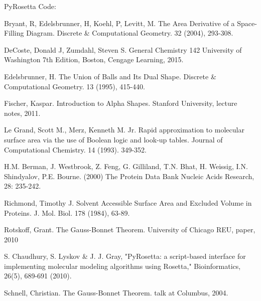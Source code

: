 \documentclass{article}
\begin{document}
PyRosetta Code:


\begin{thebibliography}{10}

Bryant, R, Edelsbrunner, H, Koehl, P, Levitt, M. The Area Derivative of a Space-Filling Diagram. Discrete \& Computational Geometry. 32 (2004), 293-308.

DeCoste, Donald J, Zumdahl, Steven S. General Chemistry 142 University of Washington 7th Edition, Boston, Cengage Learning, 2015.

Edelsbrunner, H. The Union of Balls and Its Dual Shape. Discrete \& Computational Geometry. 13 (1995), 415-440.

Fischer, Kaspar. Introduction to Alpha Shapes. Stanford University, lecture notes, 2011.

Le Grand, Scott M., Merz, Kenneth M. Jr. Rapid approximation to molecular surface area via the use of Boolean logic and look-up tables. Journal of Computational Chemistry. 14 (1993). 349-352.

H.M. Berman, J. Westbrook, Z. Feng, G. Gilliland, T.N. Bhat, H. Weissig, I.N. Shindyalov, P.E. Bourne.
(2000) The Protein Data Bank Nucleic Acids Research, 28: 235-242.

Richmond, Timothy J. Solvent Accessible Surface Area and Excluded Volume in Proteins. J. Mol. Biol. 178 (1984), 63-89.

Rotskoff, Grant. The Gauss-Bonnet Theorem. University of Chicago REU, paper, 2010

S. Chaudhury, S. Lyskov \& J. J. Gray, "PyRosetta: a script-based interface for implementing molecular modeling algorithms using Rosetta," Bioinformatics, 26(5), 689-691 (2010).

Schnell, Christian. The Gauss-Bonnet Theorem. talk at Columbus, 2004.

\end{thebibliography}

\listoffigures
\end{document}
